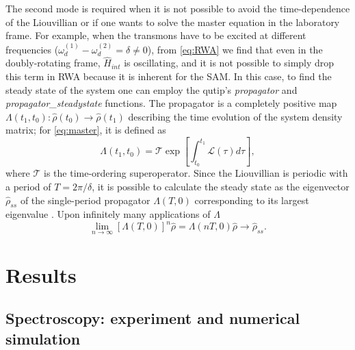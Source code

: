\documentclass[%
 aps, prx,
 amsmath,amssymb,
 reprint,%
superscriptaddress
]{revtex4-2}
\begin{document}
The second mode is required when it is not 
possible to avoid the time-dependence of the 
Liouvillian or if one wants to solve the master 
equation in the laboratory frame. For example, 
when the transmons have to be excited at 
different frequencies ($\omega_d^{(1)} - \omega_d^{(2)} = 
\delta \neq 0$), from \autoref{eq:RWA} we find 
that even in the doubly-rotating frame, $\hat 
H_{int}$ is oscillating, and it is not possible 
to simply drop this term in RWA because it is 
inherent for the SAM. In this case, to find the 
steady state of the system one can employ the 
qutip's \textit{propagator} and 
\textit{propagator\_steadystate} functions. The 
propagator is a completely positive map 
$\Lambda(t_1, t_0): \hat \rho(t_0) \rightarrow 
\hat \rho(t_1)$ describing the time evolution of 
the system density matrix; for 
\autoref{eq:master}, it is defined as
\begin{equation}
\Lambda(t_1, t_0) = \mathcal{T} \exp [\int_{t_0}^{t_1} \mathcal L(\tau) d\tau],
\label{eq:propagator}
\end{equation}
where $\mathcal T$ is the time-ordering 
superoperator. Since the Liouvillian is periodic 
with a period of $T = 2\pi/\delta$, it is 
possible to calculate the steady state as the 
eigenvector $\hat \rho_{ss}$ of the single-period 
propagator $\Lambda(T, 0)$ corresponding to its 
largest eigenvalue  \cite{dittrich1998quantum, 
rivas2012open}. Upon infinitely many applications 
of $\Lambda$
\[
\lim_{n\to \infty} \left[\Lambda(T, 0)\right]^n \hat \rho = \Lambda(nT, 0) \hat \rho \to \hat \rho_{ss}.
\]


\section{Results}

\subsection{\label{sec:level1} Spectroscopy: experiment and numerical simulation}
\end{document}
